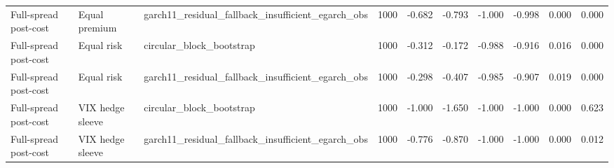\begin{tabular}{lllrrrrrrr}
Full-spread post-cost & Equal premium & garch11\_residual\_fallback\_insufficient\_egarch\_obs & 1000 & -0.682 & -0.793 & -1.000 & -0.998 & 0.000 & 0.000 \\
Full-spread post-cost & Equal risk & circular\_block\_bootstrap & 1000 & -0.312 & -0.172 & -0.988 & -0.916 & 0.016 & 0.000 \\
Full-spread post-cost & Equal risk & garch11\_residual\_fallback\_insufficient\_egarch\_obs & 1000 & -0.298 & -0.407 & -0.985 & -0.907 & 0.019 & 0.000 \\
Full-spread post-cost & VIX hedge sleeve & circular\_block\_bootstrap & 1000 & -1.000 & -1.650 & -1.000 & -1.000 & 0.000 & 0.623 \\
Full-spread post-cost & VIX hedge sleeve & garch11\_residual\_fallback\_insufficient\_egarch\_obs & 1000 & -0.776 & -0.870 & -1.000 & -1.000 & 0.000 & 0.012 \\
\bottomrule
\end{tabular}
